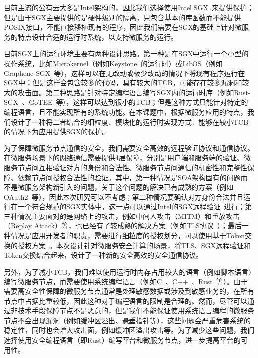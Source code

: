 目前主流的公有云大多是Intel架构的，因此我们选择使用Intel SGX~\cite{costan2016intel}来提供保护；但是由于SGX主要提供的是硬件级别的隔离，只包含基本的库函数而不能提供POSIX接口，不能直接移植现有的程序，因此我们需要在SGX的基础上针对微服务的特点设计合适的运行时系统，以支持微服务的运行。

目前SGX上的运行环境主要有两种设计思路。第一种是在SGX中运行一个小型的操作系统，比如Microkernel（例如Keystone~\cite{lee2020keystone}的运行时）或LibOS（例如Graphene-SGX~\cite{tsai2017graphene}等），这样可以在无改动或极少改动的情况下将现有程序运行在SGX中；但是这样会包含较多的代码，具有较大的TCB，可能存在较多漏洞和较大的攻击面。第二种思路是针对特定编程语言编写SGX内的运行时库（例如Rust-SGX~\cite{wang2019towards}、GoTEE~\cite{ghosn2019secured}等），这样可以达到很小的TCB；但是这种方式只能针对特定的编程语言，且不能实现所有的系统功能。在本课题中，根据微服务应用的特点，我们设计了一种将二者结合的细粒度、模块化的运行时实现方式，能够在较小TCB的情况下为应用提供SGX的保护。

为了保障微服务节点通信的安全，我们需要安全高效的远程验证协议和通信协议。在微服务场景下的网络通信需要提供4层保障，分别是用户端和服务端的验证、微服务节点间互相验证对方的身份和合法性、微服务节点间通信的机密性和完整性保障、依赖节点间授权合法性的验证。其中，第一种情况是SOA架构固有的问题而不是微服务架构新引入的问题，关于这个问题的解决已有成熟的方案（例如OAuth2~\cite{oauth2spec}等），因此本次研究可以不考虑；第二种情况要确认对方身份合法并且运行在一个符合规范的SGX实体中，这一点可以通过Intel的SGX远程验证~\cite{intel-sgx-ra}进行；第三种情况主要面对的是网络上的攻击，例如中间人攻击（MITM）和重放攻击（Replay Attack）等，也已经有了较成熟的解决方案（例如TLS协议~\cite{8446}）；最后一种情况是应用开发者的职责，需要进行细粒度的授权划分，可以使用基于Token交换的授权方案~\cite{rfc8693}。本次设计针对微服务安全计算的场景，将TLS、SGX远程验证和Token交换结合起来，设计了一种新的安全高效的安全通信协议。

另外，为了减小TCB，我们难以使用运行时内存占用较大的语言（例如脚本语言）编写微服务节点，而需要使用系统编程语言（例如C~\cite{kernighan1988c}、C++~\cite{stroustrup2013cpp}、Rust~\cite{rust-lang}等）。由于需要高安全性保障的微服务节点通常是处理敏感数据或涉及到敏感业务的，在所有节点中占据比重较低，因此这种对于编程语言的限制是合理的。然而，尽管可以通过非技术手段保障节点不是恶意的，但是我们不能保证使用系统语言编程的微服务节点不会出现漏洞（例如缓冲区溢出、悬垂指针等），这些问题会严重危害系统的稳定性，同时也会增大攻击面，例如缓冲区溢出攻击等。为了减少这些问题，我们选择使用安全编程语言（即Rust）编写平台和微服务节点，进一步提高平台的可用性。

